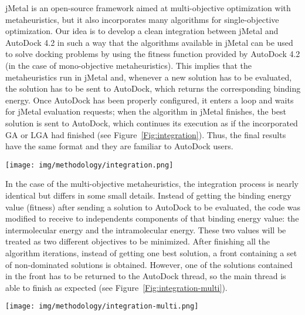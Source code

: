 jMetal is an open-source framework aimed at multi-objective optimization with metaheuristics, but it also incorporates many algorithms for single-objective optimization. Our idea is to develop a clean integration between jMetal and AutoDock 4.2 in such a way that the algorithms available in jMetal can be used to solve docking problems by using the fitness function provided by AutoDock 4.2 (in the case of mono-objective metaheuristics). This implies that the metaheuristics run in jMetal and, whenever a new solution has to be evaluated, the solution has to be sent to AutoDock, which returns the corresponding binding energy. Once AutoDock has been properly configured, it enters a loop and waits for jMetal evaluation requests; when the algorithm in jMetal finishes, the best solution is sent to AutoDock, which continues its execution as if the incorporated GA or LGA had finished (see Figure~\ref{Fig:integration}). Thus, the final results have the same format and they are familiar to AutoDock users.

\begin{figure*}[!h]%
	\centerline{\texttt{[image: img/methodology/integration.png]}}
	\caption{Sequence diagram which represents the communication between AutoDock and jMetal during a mono-objective algorithm execution. The two threads communicate with each other a number of times, equal to the number of evaluations. Finally, the jMetal thread returns the best solution to the main AutoDock thread.}
	\label{Fig:integration} 
\end{figure*}

In the case of the multi-objective metaheuristics, the integration process is nearly identical but differs in some small details. Instead of getting the binding energy value (fitness) after sending a solution to AutoDock to be evaluated, the code was modified to receive to independents components of that binding energy value: the intermolecular energy and the intramolecular energy. These two values will be treated as two different objectives to be minimized. After finishing all the algorithm iterations, instead of getting one best solution, a front containing a set of non-dominated solutions is obtained. However, one of the solutions contained in the front has to be returned to the AutoDock thread, so the main thread is able to finish as expected (see Figure~\ref{Fig:integration-multi}).

\begin{figure*}[!h]%
	\centerline{\texttt{[image: img/methodology/integration-multi.png]}}
	\caption{Sequence diagram which represents the communication between AutoDock and jMetal during a multi-objective algorithm execution. The two threads communicate with each other a number of times, equal to the number of evaluations. Finally, the jMetal thread returns a non-dominated solution to the main AutoDock thread. The entire approximated front is returned by the jMetalCpp thread in an output file.}
	\label{Fig:integration-multi} 
\end{figure*}

